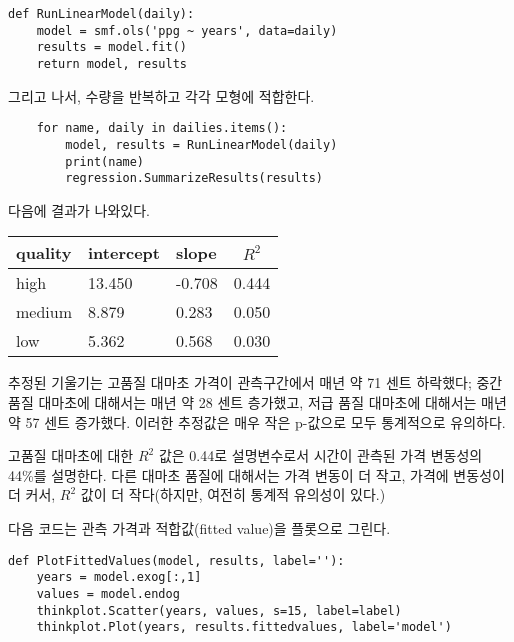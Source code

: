 
\begin{verbatim}
def RunLinearModel(daily):
    model = smf.ols('ppg ~ years', data=daily)
    results = model.fit()
    return model, results
\end{verbatim}

그리고 나서, 수량을 반복하고 각각 모형에 적합한다.

\begin{verbatim}
    for name, daily in dailies.items():
        model, results = RunLinearModel(daily)
        print(name)
        regression.SummarizeResults(results)
\end{verbatim}

다음에 결과가 나와있다.

\begin{center}
\begin{tabular}{|l|l|l|c|} \hline
quality & intercept & slope & $R^2$ \\ \hline
high    & 13.450  & -0.708  & 0.444 \\
medium  &  8.879  & 0.283   & 0.050 \\
low     &  5.362  & 0.568   & 0.030 \\
\hline
\end{tabular}
\end{center}

추정된 기울기는 고품질 대마초 가격이 관측구간에서 매년 약 71 센트 하락했다; 중간 품질 대마초에 대해서는 매년 약 28 센트 층가했고, 저급 품질 대마초에 대해서는 매년 약 57 센트 증가했다. 이러한 추정값은 매우 작은 p-값으로 모두 통계적으로 유의하다.


고품질 대마초에 대한 $R^2$ 값은 0.44로 설명변수로서 시간이 관측된 가격 변동성의 44\%를 설명한다.
다른 대마초 품질에 대해서는 가격 변동이 더 작고, 가격에 변동성이 더 커서, $R^2$ 값이 더 작다(하지만, 여전히 통계적 유의성이 있다.)

다음 코드는 관측 가격과 적합값(fitted value)을 플롯으로 그린다.

\begin{verbatim}
def PlotFittedValues(model, results, label=''):
    years = model.exog[:,1]
    values = model.endog
    thinkplot.Scatter(years, values, s=15, label=label)
    thinkplot.Plot(years, results.fittedvalues, label='model')
\end{verbatim}

